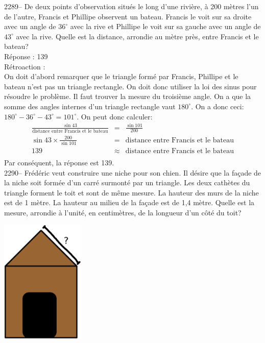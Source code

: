 \documentclass[letterpaper, 12pt]{article}
\begin{document}
2289-- De deux points d'observation situ\'es le long d'une rivi\`ere, \`a 200 m\`etres l'un de l'autre, Francis et Phillipe observent un bateau. Francis le voit sur sa droite avec un angle de $36^{\circ}$ avec la rive et Phillipe le voit sur sa gauche avec un angle de $43^{\circ}$ avec la rive. Quelle est la distance, arrondie au m\`etre pr\`es, entre Francis et le bateau?\\

R\'eponse : 139\\

R\'etroaction :\\
On doit d'abord remarquer que le triangle form\'e par Francis, Phillipe et le bateau n'est pas un triangle rectangle. On doit donc utiliser la loi des sinus pour r\'esoudre le probl\`eme. Il faut trouver la mesure du troisi\`eme angle. On a que la somme des angles internes d'un triangle rectangle vaut $180^{\circ}$. On a donc ceci: $180^{\circ}-36^{\circ}-43^{\circ}=101^{\circ}$. On peut donc calculer:
\begin{eqnarray*}
\frac{\sin{43}}{\textrm{distance entre Francis et le bateau}}&=&\frac{\sin{101}}{200}\\[2mm]
\sin{43}\times \frac{200}{\sin{101}}&=&\textrm{distance entre Francis et le bateau}\\[2mm]
139&\approx&\textrm{distance entre Francis et le bateau}\\
\end{eqnarray*}
Par cons\'equent, la r\'eponse est 139.\\

2290-- Fr\'ed\'eric veut construire une niche pour son chien. Il d\'esire que la fa\c cade de la niche soit form\'ee d'un carr\'e surmont\'e par un triangle. Les deux cath\`etes du triangle forment le toit et sont de m\^eme mesure. La hauteur des murs de la niche est de 1 m\`etre. La hauteur au milieu de la fa\c cade est de 1,4 m\`etre. Quelle est la mesure, arrondie \`a l'unit\'e, en centim\`etres, de la longueur d'un c\^ot\'e du toit?
\begin{center}
 \includegraphics[width=4cm,bb=14 14 627 807]{Niche2290.eps}
\end{center}
\end{document}
